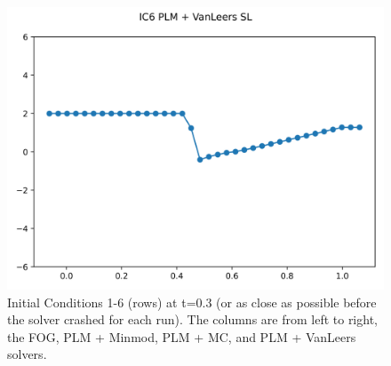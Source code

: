\documentclass{article}
\begin{document}
\begin{figure}[t]
        \includegraphics[width=.95\textwidth]{../../code/IC6Methodpv_plot.png}
    \emp
    \caption{Initial Conditions 1-6 (rows) at t=0.3 (or as close as possible before the
    solver crashed for each run). The columns are from left to right, the FOG,
    PLM + Minmod, PLM + MC, and PLM + VanLeers solvers.}
    \label{fig:sol_1_6}
\end{figure}
\end{document}
